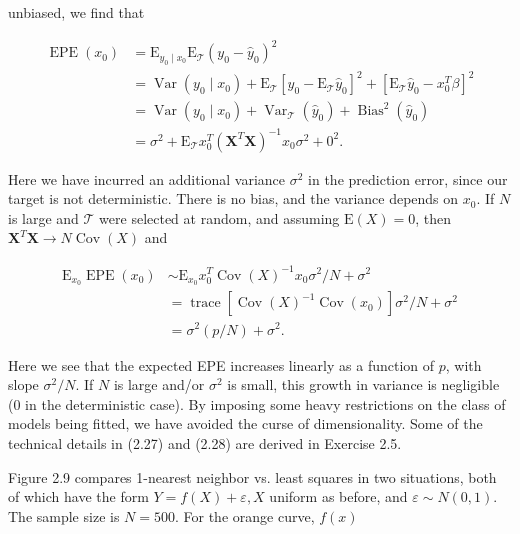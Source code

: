 \documentclass[10pt]{article}
\begin{document}
unbiased, we find that


\begin{align*}
\operatorname{EPE}\left(x_{0}\right) & =\mathrm{E}_{y_{0} \mid x_{0}} \mathrm{E}_{\mathcal{T}}\left(y_{0}-\hat{y}_{0}\right)^{2} \\
& =\operatorname{Var}\left(y_{0} \mid x_{0}\right)+\mathrm{E}_{\mathcal{T}}\left[\hat{y}_{0}-\mathrm{E}_{\mathcal{T}} \hat{y}_{0}\right]^{2}+\left[\mathrm{E}_{\mathcal{T}} \hat{y}_{0}-x_{0}^{T} \beta\right]^{2} \\
& =\operatorname{Var}\left(y_{0} \mid x_{0}\right)+\operatorname{Var}_{\mathcal{T}}\left(\hat{y}_{0}\right)+\operatorname{Bias}^{2}\left(\hat{y}_{0}\right) \\
& =\sigma^{2}+\mathrm{E}_{\mathcal{T}} x_{0}^{T}\left(\mathbf{X}^{T} \mathbf{X}\right)^{-1} x_{0} \sigma^{2}+0^{2} . \tag{2.27}
\end{align*}


Here we have incurred an additional variance $\sigma^{2}$ in the prediction error, since our target is not deterministic. There is no bias, and the variance depends on $x_{0}$. If $N$ is large and $\mathcal{T}$ were selected at random, and assuming $\mathrm{E}(X)=0$, then $\mathbf{X}^{T} \mathbf{X} \rightarrow N \operatorname{Cov}(X)$ and


\begin{align*}
\mathrm{E}_{x_{0}} \operatorname{EPE}\left(x_{0}\right) & \sim \mathrm{E}_{x_{0}} x_{0}^{T} \operatorname{Cov}(X)^{-1} x_{0} \sigma^{2} / N+\sigma^{2} \\
& =\operatorname{trace}\left[\operatorname{Cov}(X)^{-1} \operatorname{Cov}\left(x_{0}\right)\right] \sigma^{2} / N+\sigma^{2} \\
& =\sigma^{2}(p / N)+\sigma^{2} . \tag{2.28}
\end{align*}


Here we see that the expected EPE increases linearly as a function of $p$, with slope $\sigma^{2} / N$. If $N$ is large and/or $\sigma^{2}$ is small, this growth in variance is negligible (0 in the deterministic case). By imposing some heavy restrictions on the class of models being fitted, we have avoided the curse of dimensionality. Some of the technical details in (2.27) and (2.28) are derived in Exercise 2.5.

Figure 2.9 compares 1-nearest neighbor vs. least squares in two situations, both of which have the form $Y=f(X)+\varepsilon, X$ uniform as before, and $\varepsilon \sim N(0,1)$. The sample size is $N=500$. For the orange curve, $f(x)$
\end{document}
